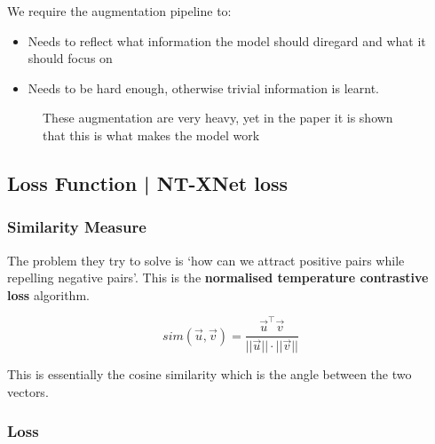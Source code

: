 \documentclass[11pt]{article}
\begin{document}
We require the augmentation pipeline to:
\begin{itemize}
    \item Needs to reflect what information the model should diregard and what it should focus on
    \item Needs to be hard enough, otherwise trivial information is learnt.
\end{itemize}

\begin{figure}[H]
    \centering
    \caption*{These augmentation are very heavy, yet in the paper it is shown that this is what makes the model work}
\end{figure}

\subsection{Loss Function | NT-XNet loss}

\subsubsection{Similarity Measure}

The problem they try to solve is `how can we attract positive pairs while repelling negative pairs'. This is the \textbf{normalised temperature contrastive loss} algorithm.

\begin{equation}
    sim(\vec u, \vec v) = \frac{\vec u ^\top \vec v}{||\vec u|| \cdot ||\vec v||}
\end{equation}

This is essentially the cosine similarity which is the angle between the two vectors.

\subsubsection{Loss}
\end{document}
